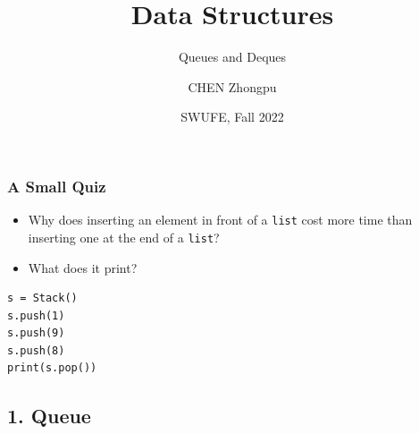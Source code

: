 \documentclass[aspectratio=169, 14pt]{beamer}
\title[Data Structures] %
{Data Structures}
\subtitle{Queues and Deques}
\author[CHEN Zhongpu] %
{CHEN Zhongpu}
\institute[] %
{
  School of Computing and Artificial Intelligence \\
  \href{mailto:zpchen@swufe.edu.cn}{zpchen@swufe.edu.cn}
}
\date[] %
{SWUFE, Fall 2022}
\begin{document}
\frame{\titlepage}

\begin{frame}[fragile]
    \frametitle{A Small Quiz}
    \begin{itemize}
        \item Why does inserting an element in front of a \texttt{list} cost more time than inserting one at the end of a \texttt{list}?
    \end{itemize}
\begin{itemize}
    \item What does it print?
\end{itemize}
    
\begin{verbatim}
s = Stack()
s.push(1)   
s.push(9)
s.push(8)
print(s.pop())
\end{verbatim}
\end{frame}

{
    \begin{frame}
        \section{\textcolor{darkmidnightblue}{1. Queue}}
    \end{frame}
}
\end{document}
